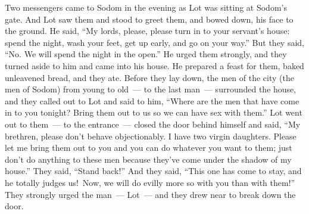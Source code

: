 
\begin{inparaenum}
     Two messengers came to Sodom in the evening as Lot was sitting at Sodom's gate. And Lot saw them and stood to greet them, and bowed down, his face to the ground.%
     He said, ``My lords, please, please turn in to your servant's house: spend the night, wash your feet, get up early, and go on your way.'' But they said, ``No. We will spend the night in the open.''%
     He urged them strongly, and they turned aside to him and came into his house. He prepared a feast for them, baked unleavened bread, and they ate.%
     Before they lay down, the men of the city (the men of Sodom) from young to old~--- to the last man~--- surrounded the house,%
     and they called out to Lot and said to him, ``Where are the men that have come in to you tonight? Bring them out to us so we can have sex with them.''%
     Lot went out to them~--- to the entrance~--- closed the door behind himself%
     and said, ``My brethren, please don't behave objectionably.%
     I have two virgin daughters. Please let me bring them out to you and you can do whatever you want to them; just don't do anything to these men because they've come under the shadow of my house.''%
     They said, ``Stand back!'' And they said, ``This one has come to stay, and he totally judges us!\understood\ Now, we will do evilly more so with you than with them!'' They strongly urged the man~--- Lot~--- and they drew near to break down the door.%

\end{inparaenum}
